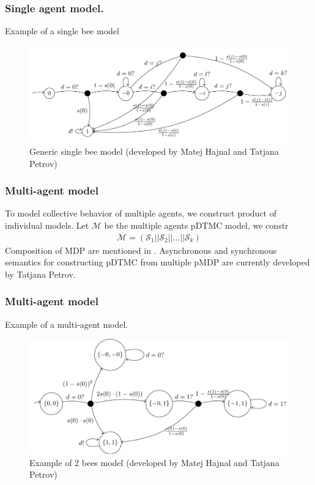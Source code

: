 \documentclass{beamer}
\begin{document}
\begin{frame}
  \frametitle{Single agent model.}
  Example of a single bee model
  \begin{figure}[t]
    \includegraphics[height=0.4\textheight]{smodel.png} \centering
    \caption{Generic single bee model (developed by Matej Hajnal and
      Tatjana Petrov)}
  \end{figure}
\end{frame}


\begin{frame}
  \frametitle{Multi-agent model}
  To model collective behavior of multiple agents, we construct product of
  individual models. Let $\mathcal{M}$ be the multiple agents pDTMC model, we constr
  \begin{align*}
    \mathcal{M} = (\mathcal{S}_1||\mathcal{S}_2||\ldots||\mathcal{S}_k) 
  \end{align*}
  Composition of MDP are mentioned in \cite{sokolova2004probabilistic}.
  Asynchronous and synchronous semantics for constructing pDTMC from multiple
  pMDP are currently developed by Tatjana Petrov.
\end{frame}

\begin{frame}
  \frametitle{Multi-agent model}
  Example of a multi-agent model.
  \begin{figure}[t]
    \includegraphics[height=0.4\textheight]{mmodel.png} \centering
    \caption{Example of 2 bees model (developed by Matej Hajnal and
      Tatjana Petrov)}
  \end{figure} 
\end{frame}
\end{document}
